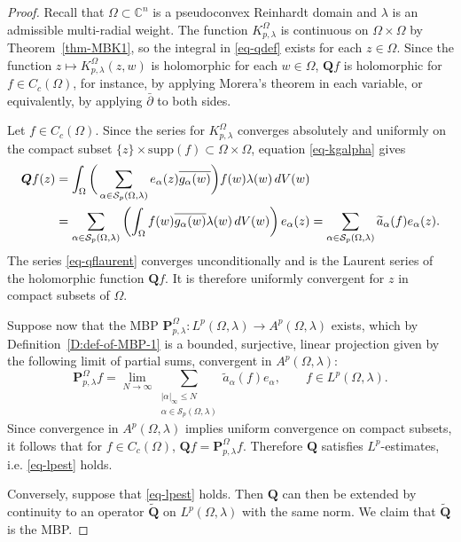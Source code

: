 \documentclass[letterpaper,11pt,reqno]{amsart}
\theoremstyle{plain}
\theoremstyle{definition}
\theoremstyle{remark}
\theoremstyle{remark}
\numberwithin{equation}{section}
\newcommand{\dbar}{\bar \partial}
\newcommand{\abs}[1]{\left\vert#1\right\vert}
\newcommand{\ol}{\overline}
\newcommand{\wt}{\widetilde}
\newcommand{\cs}{{\mathcal S}}
\newcommand{\C}{{\mathbb C}}
\begin{document}
\begin{proof} Recall that  $\Omega \subset \C^n$ is a pseudoconvex Reinhardt domain and $\lambda$ is an admissible multi-radial weight. 
The function $K_{p,\lambda}^\Omega$ is continuous on $\Omega\times \Omega$ by Theorem~\ref{thm-MBK1}, 
so the integral in \eqref{eq-qdef} exists for each $z\in \Omega$. 
Since the function $z \mapsto K_{p,\lambda}^\Omega(z, w)$ is holomorphic for each $w \in \Omega$, $\bm{Q}f$ is holomorphic for $f\in C_c(\Omega)$, for instance, by applying Morera's theorem in each variable, or equivalently, by applying $\dbar$ to both sides.

Let $f\in C_c(\Omega)$. 
Since the series for $K_{p,\lambda}^\Omega$ converges absolutely and uniformly on the compact subset $\{z\}\times \mathrm{supp}(f) \subset \Omega\times \Omega$, equation \eqref{eq-kgalpha} gives
\begin{align}
\bm{Q}f(z) &= \int_\Omega \bigg(\sum_{\alpha \in \cs_p(\Omega,\lambda)} e_\alpha(z)\ol{g_\alpha(w)}\bigg)f(w)\lambda(w)\,dV(w) \notag \\
&=\sum_{\alpha \in \cs_p(\Omega,\lambda)} \left( \int_\Omega f(w)  \ol{g_\alpha(w)}\lambda(w)\,dV(w)\right)e_\alpha(z)
=\sum_{\alpha \in \cs_p(\Omega,\lambda)} \wt{a}_\alpha(f) e_\alpha(z). \label{eq-qflaurent}
\end{align}
The series \eqref{eq-qflaurent} converges unconditionally and is the Laurent series of the holomorphic function $\bm{Q}f$. It is therefore uniformly convergent for $z$ in compact subsets of $\Omega$.

Suppose now that the MBP $\bm{P}_{p,\lambda}^\Omega:L^p(\Omega, \lambda)\to A^p(\Omega, \lambda) $ exists, which by Definition~\ref{D:def-of-MBP-1} is a bounded, surjective, linear projection given by the following limit of partial sums, convergent in $A^p(\Omega,\lambda)$:
\begin{equation}\label{eq-sqpartialsums} 
\bm{P}_{p,\lambda}^\Omega f = \lim_{N\to \infty} \sum_{\substack{\abs{\alpha}_\infty\leq N\\\alpha\in \cs_p(\Omega,\lambda) }}\wt{a}_\alpha(f) e_\alpha, \qquad f \in L^p(\Omega,\lambda).
\end{equation}
Since convergence in $A^p(\Omega,\lambda)$ implies uniform convergence on compact subsets, it follows that for $f \in C_c(\Omega)$, $\bm{Q}f = \bm{P}_{p,\lambda}^\Omega f$. 
Therefore $\bm{Q}$ satisfies $L^p$-estimates, i.e. \eqref{eq-lpest} holds.

Conversely, suppose that \eqref{eq-lpest} holds.  
Then $\bm{Q}$ can then be extended by continuity to an operator $\wt{\bm{Q}}$ on $L^p(\Omega, \lambda)$ with the same norm. 
We claim that $\wt{\bm{Q}}$ is the MBP.


\end{proof}
\end{document}
